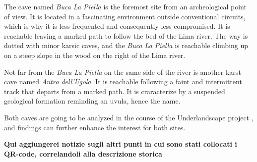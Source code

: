 \documentclass[sustainability,article,submit,pdftex,moreauthors]{Definitions/mdpi}
\begin{document}

The cave named {\em Buca La Piella} is the foremost site from an archeological point of view. It is located in a fascinating environment outside conventional circuits, which is why it is less frequented and consequently less compromised. It is reachable leaving a marked path to follow the bed of the Lima river. The way is dotted with minor karsic caves, and the {\em Buca La Piella} is reachable climbing up on a steep slope in the wood on the right of the Lima river. 


Not far from the {\em Buca La Piella} on the same side of the river is another karst cave named {\em Antro dell'Ugola}. It is reachable following a faint and intermittent track that departs from a marked path. It is craracterize by a suspended geological formation reminding an uvula, hence the name.

Both caves are going to be analyzed in the course of the Underlandscape project \cite{Underlandscape}, and findings can further enhance the interest for both sites.

\textbf{Qui aggiungerei notizie sugli altri punti in cui sono stati collocati i QR-code, correlandoli alla descrizione storica
}
\end{document}
